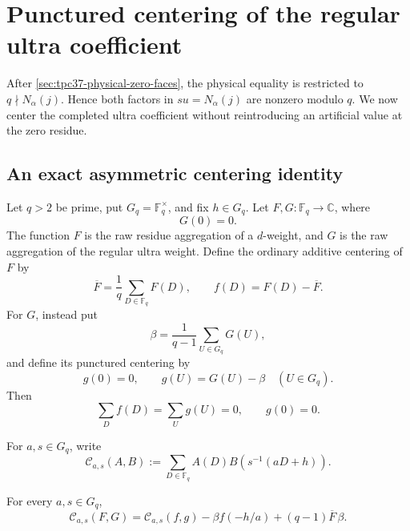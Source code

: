 \section{Punctured centering of the regular ultra coefficient}
\label{sec:tpc37-punctured-centering}

After \cref{sec:tpc37-physical-zero-faces}, the physical equality is
restricted to \(q\nmid N_\alpha(j)\).  Hence both factors in
\(su=N_\alpha(j)\) are nonzero modulo \(q\).  We now center the completed
ultra coefficient without reintroducing an artificial value at the zero
residue.

\subsection{An exact asymmetric centering identity}

Let \(q>2\) be prime, put \(G_q=\mathbb F_q^\times\), and fix
\(h\in G_q\).  Let \(F,G:\mathbb F_q\to\mathbb C\), where
\begin{equation}
 G(0)=0.
 \label{eq:tpc37-raw-g-zero}
\end{equation}
The function \(F\) is the raw residue aggregation of a \(d\)-weight, and
\(G\) is the raw aggregation of the regular ultra weight.  Define the
ordinary additive centering of \(F\) by
\begin{equation}
 \overline F=\frac1q\sum_{D\in\mathbb F_q}F(D),
 \qquad f(D)=F(D)-\overline F.
 \label{eq:tpc37-f-centering}
\end{equation}
For \(G\), instead put
\begin{equation}
 \beta=\frac1{q-1}\sum_{U\in G_q}G(U),
 \label{eq:tpc37-punctured-mean}
\end{equation}
and define its punctured centering by
\begin{equation}
 g(0)=0,
 \qquad
 g(U)=G(U)-\beta\quad(U\in G_q).
 \label{eq:tpc37-punctured-g}
\end{equation}
Then
\begin{equation}
 \sum_D f(D)=\sum_U g(U)=0,
 \qquad g(0)=0.
 \label{eq:tpc37-punctured-properties}
\end{equation}

For \(a,s\in G_q\), write
\begin{equation}
 \mathcal C_{a,s}(A,B)
 :=\sum_{D\in\mathbb F_q}
 A(D)B\!\left(s^{-1}(aD+h)\right).
 \label{eq:tpc37-affine-correlation}
\end{equation}

\begin{proposition}
\label{prop:tpc37-punctured-identity}
For every \(a,s\in G_q\),
\begin{equation}
 \boxed{
 \mathcal C_{a,s}(F,G)
 =\mathcal C_{a,s}(f,g)
 -\beta f(-h/a)
 +(q-1)\overline F\,\beta.}
 \label{eq:tpc37-punctured-identity}
\end{equation}
\end{proposition}

